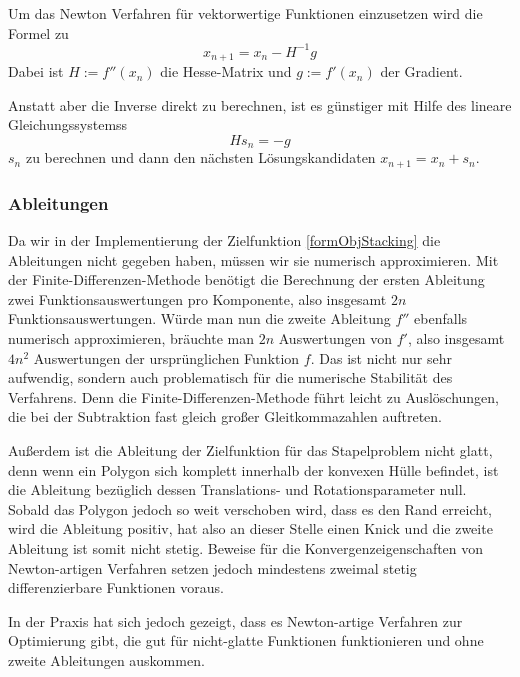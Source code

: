 \documentclass[runningheads,a4paper]{llncs}
\begin{document}
Um das Newton Verfahren für vektorwertige Funktionen einzusetzen wird die Formel zu
\begin{equation}
\label{eq:ndimnewtonstep}
x_{n+1} = x_n - H^{-1}g
\end{equation}
Dabei ist $H := f''(x_n)$ die Hesse-Matrix und $g := f'(x_n)$ der Gradient.

Anstatt aber die Inverse direkt zu berechnen, ist es günstiger mit Hilfe des lineare Gleichungssystemss
\begin{equation}
\label{eq:newtonlineq}
Hs_n=-g
\end{equation}
$s_n$ zu berechnen und dann den nächsten Lösungskandidaten ${x_{n+1} = x_n + s_n}$.

\subsubsection{Ableitungen}
Da wir in der Implementierung der Zielfunktion \ref{formObjStacking} die Ableitungen nicht gegeben haben, müssen wir sie numerisch approximieren. Mit der Finite-Differenzen-Methode benötigt die Berechnung der ersten Ableitung zwei Funktionsauswertungen pro Komponente, also insgesamt $2n$ Funktionsauswertungen. Würde man nun die zweite Ableitung $f''$ ebenfalls numerisch approximieren, bräuchte man $2n$ Auswertungen von $f'$, also insgesamt $4n^2$ Auswertungen der ursprünglichen Funktion $f$. Das ist nicht nur sehr aufwendig, sondern auch problematisch für die numerische Stabilität des Verfahrens. Denn die Finite-Differenzen-Methode führt leicht zu Auslöschungen, die bei der Subtraktion fast gleich großer Gleitkommazahlen auftreten.

Außerdem ist die Ableitung der Zielfunktion für das Stapelproblem nicht glatt, denn wenn ein Polygon sich komplett innerhalb der konvexen Hülle befindet, ist die Ableitung bezüglich dessen Translations- und Rotationsparameter null. Sobald das Polygon jedoch so weit verschoben wird, dass es den Rand erreicht, wird die Ableitung positiv, hat also an dieser Stelle einen Knick und die zweite Ableitung ist somit nicht stetig. Beweise für die Konvergenzeigenschaften von Newton-artigen Verfahren setzen jedoch mindestens zweimal stetig differenzierbare Funktionen voraus.

In der Praxis hat sich jedoch gezeigt, dass es Newton-artige Verfahren zur Optimierung gibt, die gut für nicht-glatte Funktionen funktionieren \cite{DBLP:journals/mp/LewisO13} und ohne zweite Ableitungen auskommen.
\end{document}
